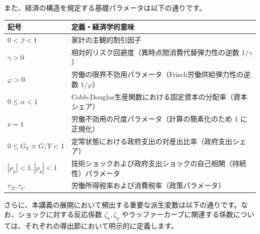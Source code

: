 \documentclass[
  japanese,
  lualatex,
  ja=standard,
  12pt,
  a4paper]{ltjsarticle}
\newcounter{none} %
\begin{document}
また、経済の構造を規定する基礎パラメータは以下の通りです。

{\def\LTcaptype{none} %
\begin{longtable}[]{@{}
  >{\raggedright\arraybackslash}p{}
  >{\raggedright\arraybackslash}p{}@{}}
\toprule\noalign{}
\begin{minipage}[b]{\linewidth}\raggedright
記号
\end{minipage} & \begin{minipage}[b]{\linewidth}\raggedright
定義・経済学的意味
\end{minipage} \\
\midrule\noalign{}
\endhead
\bottomrule\noalign{}
\endlastfoot
\(0 < \beta < 1\) & 家計の主観的割引因子 \\
\(\gamma > 0\) & 相対的リスク回避度（異時点間消費代替弾力性の逆数
\(1/\gamma\)） \\
\(\varphi > 0\) & 労働の限界不効用パラメータ（Frisch労働供給弾力性の逆数
\(1/\varphi\)） \\
\(0 \leq \alpha < 1\) &
Cobb-Douglas生産関数における固定資本の分配率（資本シェア） \\
\(\nu = 1\) & 労働不効用の尺度パラメータ（計算の簡素化のため \(1\)
に正規化） \\
\(0 \leq G_Y \equiv G/Y < 1\) &
定常状態における政府支出の対産出比率（政府支出シェア） \\
\(|\rho_a| < 1, |\rho_g| < 1\) &
技術ショックおよび政府支出ショックの自己相関（持続性）パラメータ \\
\(\tau_N, \tau_C\) & 労働所得税率および消費税率（政策パラメータ） \\
\end{longtable}
}

さらに、本講義の展開において頻出する重要な派生変数は以下の通りです。なお、ショックに対する反応係数
\(\zeta_a, \zeta_g\)
やラッファーカーブに関連する係数については、それぞれの導出節において明示的に定義します。
\end{document}
